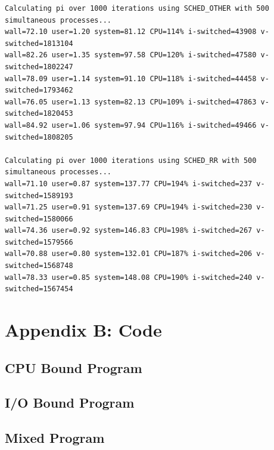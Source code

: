 \documentclass[12pt]{article}
\begin{document}
\begin{small}
\begin{verbatim}
Calculating pi over 1000 iterations using SCHED_OTHER with 500 simultaneous processes...
wall=72.10 user=1.20 system=81.12 CPU=114% i-switched=43908 v-switched=1813104
wall=82.26 user=1.35 system=97.58 CPU=120% i-switched=47580 v-switched=1802247
wall=78.09 user=1.14 system=91.10 CPU=118% i-switched=44458 v-switched=1793462
wall=76.05 user=1.13 system=82.13 CPU=109% i-switched=47863 v-switched=1820453
wall=84.92 user=1.06 system=97.94 CPU=116% i-switched=49466 v-switched=1808205

Calculating pi over 1000 iterations using SCHED_RR with 500 simultaneous processes...
wall=71.10 user=0.87 system=137.77 CPU=194% i-switched=237 v-switched=1589193
wall=71.25 user=0.91 system=137.69 CPU=194% i-switched=230 v-switched=1580066
wall=74.36 user=0.92 system=146.83 CPU=198% i-switched=267 v-switched=1579566
wall=70.88 user=0.80 system=132.01 CPU=187% i-switched=206 v-switched=1568748
wall=78.33 user=0.85 system=148.08 CPU=190% i-switched=240 v-switched=1567454
\end{verbatim}
\end{small}

\section{Appendix B: Code}

\subsection{CPU Bound Program}
\begin{footnotesize}


\subsection{I/O Bound Program}


\subsection{Mixed Program}

\end{footnotesize}
\end{document}
